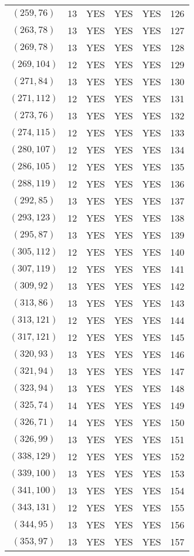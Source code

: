 \begin{longtable}{|c|c|c|c|c|c|}
$(259, 76)$ & 13 & YES & YES & YES & 126\\
$(263, 78)$ & 13 & YES & YES & YES & 127\\
$(269, 78)$ & 13 & YES & YES & YES & 128\\
$(269, 104)$ & 12 & YES & YES & YES & 129\\
$(271, 84)$ & 13 & YES & YES & YES & 130\\
$(271, 112)$ & 12 & YES & YES & YES & 131\\
$(273, 76)$ & 13 & YES & YES & YES & 132\\
$(274, 115)$ & 12 & YES & YES & YES & 133\\
$(280, 107)$ & 12 & YES & YES & YES & 134\\
$(286, 105)$ & 12 & YES & YES & YES & 135\\
$(288, 119)$ & 12 & YES & YES & YES & 136\\
$(292, 85)$ & 13 & YES & YES & YES & 137\\
$(293, 123)$ & 12 & YES & YES & YES & 138\\
$(295, 87)$ & 13 & YES & YES & YES & 139\\
$(305, 112)$ & 12 & YES & YES & YES & 140\\
$(307, 119)$ & 12 & YES & YES & YES & 141\\
$(309, 92)$ & 13 & YES & YES & YES & 142\\
$(313, 86)$ & 13 & YES & YES & YES & 143\\
$(313, 121)$ & 12 & YES & YES & YES & 144\\
$(317, 121)$ & 12 & YES & YES & YES & 145\\
$(320, 93)$ & 13 & YES & YES & YES & 146\\
$(321, 94)$ & 13 & YES & YES & YES & 147\\
$(323, 94)$ & 13 & YES & YES & YES & 148\\
$(325, 74)$ & 14 & YES & YES & YES & 149\\
$(326, 71)$ & 14 & YES & YES & YES & 150\\
$(326, 99)$ & 13 & YES & YES & YES & 151\\
$(338, 129)$ & 12 & YES & YES & YES & 152\\
$(339, 100)$ & 13 & YES & YES & YES & 153\\
$(341, 100)$ & 13 & YES & YES & YES & 154\\
$(343, 131)$ & 12 & YES & YES & YES & 155\\
$(344, 95)$ & 13 & YES & YES & YES & 156\\
$(353, 97)$ & 13 & YES & YES & YES & 157\\

\end{longtable}
